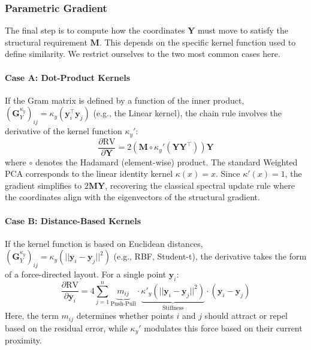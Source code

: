 \documentclass[11pt]{article}
\begin{document}
	\subsubsection{Parametric Gradient}
	
	The final step is to compute how the coordinates $\mathbf{Y}$ must move to satisfy the structural requirement $\mathbf{M}$. This depends on the specific kernel function used to define similarity. We restrict ourselves to the two most common cases here.
	
	\paragraph{Case A: Dot-Product Kernels}
	If the Gram matrix is defined by a function of the inner product, $(\mathbf{G}^{\kappa_y}_{Y})_{ij} = \kappa_y(\mathbf{y}_i^\top \mathbf{y}_j)$ (e.g., the Linear kernel), the chain rule involves the derivative of the kernel function $\kappa_y'$:
	\begin{equation}
		\frac{\partial \text{RV}}{\partial \mathbf{Y}} = 2 \left( \mathbf{M} \circ \kappa_y'(\mathbf{Y}\mathbf{Y}^\top) \right) \mathbf{Y}
	\end{equation}
	where $\circ$ denotes the Hadamard (element-wise) product. The standard Weighted PCA corresponds to the linear identity kernel $\kappa(x)=x$. Since $\kappa'(x)=1$, the gradient simplifies to $2\mathbf{M}\mathbf{Y}$, recovering the classical spectral update rule where the coordinates align with the eigenvectors of the structural gradient.
	
	\paragraph{Case B: Distance-Based Kernels}
	If the kernel function is based on Euclidean distances, $(\mathbf{G}^{\kappa_y}_{Y})_{ij} = \kappa_y(||\mathbf{y}_i - \mathbf{y}_j||^2)$ (e.g., RBF, Student-t), the derivative takes the form of a force-directed layout. For a single point $\mathbf{y}_i$:
	\begin{equation}
		\frac{\partial \text{RV}}{\partial \mathbf{y}_i} = 4 \sum_{j=1}^n \underbrace{m_{ij}}_{\text{Push-Pull}} \cdot \underbrace{\kappa'_y(||\mathbf{y}_i - \mathbf{y}_j||^2)}_{\text{Stiffness}} \cdot (\mathbf{y}_i - \mathbf{y}_j)
	\end{equation}
	Here, the term $m_{ij}$ determines whether points $i$ and $j$ should attract or repel based on the residual error, while $\kappa_y'$ modulates this force based on their current proximity.
	
\end{document}
